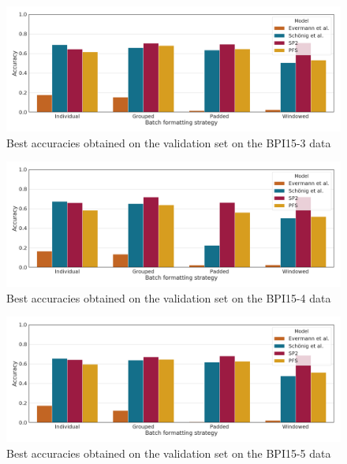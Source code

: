 \begin{figure}
    \centering
    \includegraphics[width=\textwidth]{gfx/bpic2015_3/accuracies.png}
    \caption{Best accuracies obtained on the validation set on the BPI15-3 data}
    \label{fig:max-accuracies-bpic2015-3}
\end{figure}
\begin{figure}
    \centering
    \includegraphics[width=\textwidth]{gfx/bpic2015_4/accuracies.png}
    \caption{Best accuracies obtained on the validation set on the BPI15-4 data}
    \label{fig:max-accuracies-bpic2015-4}
\end{figure}
\begin{figure}
    \centering
    \includegraphics[width=\textwidth]{gfx/bpic2015_5/accuracies.png}
    \caption{Best accuracies obtained on the validation set on the BPI15-5 data}
    \label{fig:max-accuracies-bpic2015-5}
\end{figure}

\FloatBarrier
